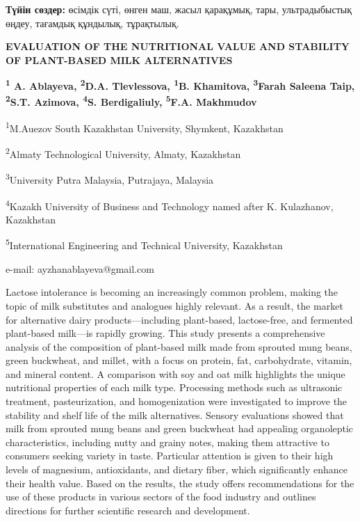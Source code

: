 {\bfseries Түйін сөздер:} өсімдік сүті, өнген маш, жасыл қарақұмық, тары,
ультрадыбыстық өңдеу, тағамдық құндылық, тұрақтылық.

\begin{articleheader}
{\bfseries EVALUATION OF THE NUTRITIONAL VALUE AND STABILITY OF PLANT-BASED
MILK ALTERNATIVES}

{\bfseries
\textsuperscript{1} A. Ablayeva\textsuperscript{\envelope },
\textsuperscript{2}D.A. Tlevlessova,
\textsuperscript{1}B. Khamitova,
\textsuperscript{3}Farah Saleena Taip,
\textsuperscript{2}S.T. Azimova,
\textsuperscript{4}S. Berdigaliuly,
\textsuperscript{5}F.A. Makhmudov
}
\end{articleheader}

\begin{affiliation}
\textsuperscript{1}M.Auezov South Kazakhstan University, Shymkent, Kazakhstan

\textsuperscript{2}Almaty Technological University, Almaty, Kazakhstan

\textsuperscript{3}University Putra Malaysia, Putrajaya, Malaysia

\textsuperscript{4}Kazakh University of Business and Technology named after K. Kulazhanov, Kazakhstan

\textsuperscript{5}International Engineering and Technical University, Kazakhstan

e-mail: ayzhanablayeva@gmail.com
\end{affiliation}

Lactose intolerance is becoming an increasingly common problem, making
the topic of milk substitutes and analogues highly relevant. As a
result, the market for alternative dairy products---including
plant-based, lactose-free, and fermented plant-based milk---is rapidly
growing. This study presents a comprehensive analysis of the composition
of plant-based milk made from sprouted mung beans, green buckwheat, and
millet, with a focus on protein, fat, carbohydrate, vitamin, and mineral
content. A comparison with soy and oat milk highlights the unique
nutritional properties of each milk type. Processing methods such as
ultrasonic treatment, pasteurization, and homogenization were
investigated to improve the stability and shelf life of the milk
alternatives. Sensory evaluations showed that milk from sprouted mung
beans and green buckwheat had appealing organoleptic characteristics,
including nutty and grainy notes, making them attractive to consumers
seeking variety in taste. Particular attention is given to their high
levels of magnesium, antioxidants, and dietary fiber, which
significantly enhance their health value. Based on the results, the
study offers recommendations for the use of these products in various
sectors of the food industry and outlines directions for further
scientific research and development.

